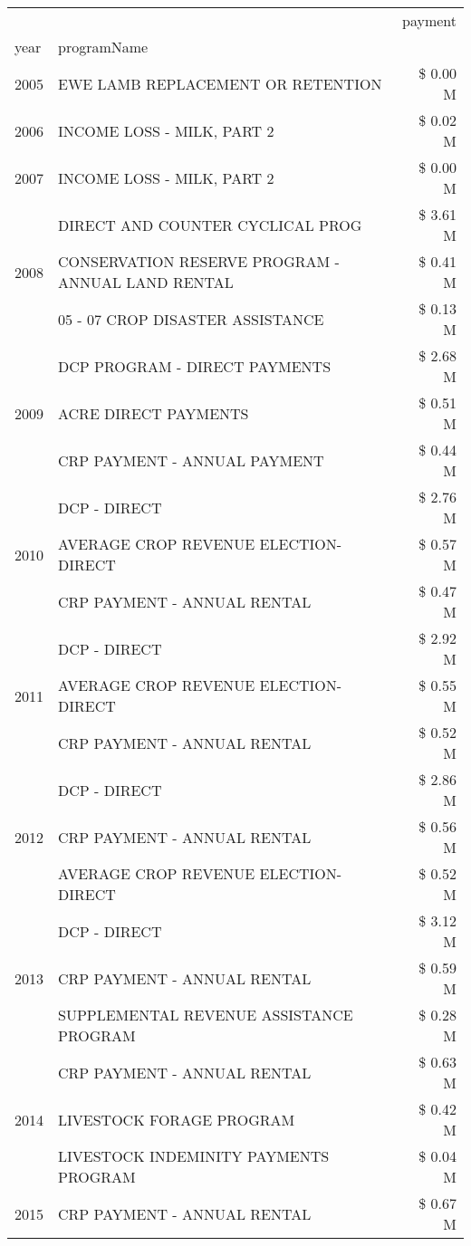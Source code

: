 \begin{tabular}{llr}
\toprule
 &  & payment \\
year & programName &  \\
\midrule
2005 & EWE LAMB REPLACEMENT OR RETENTION & \$ 0.00 M \\
\cline{1-3}
2006 & INCOME LOSS - MILK, PART 2 & \$ 0.02 M \\
\cline{1-3}
2007 & INCOME LOSS - MILK, PART 2 & \$ 0.00 M \\
\cline{1-3}
\multirow[t]{3}{*}{2008} & DIRECT AND COUNTER CYCLICAL PROG & \$ 3.61 M \\
 & CONSERVATION RESERVE PROGRAM - ANNUAL LAND RENTAL & \$ 0.41 M \\
 & 05 - 07 CROP DISASTER ASSISTANCE & \$ 0.13 M \\
\cline{1-3}
\multirow[t]{3}{*}{2009} & DCP PROGRAM - DIRECT PAYMENTS & \$ 2.68 M \\
 & ACRE DIRECT PAYMENTS & \$ 0.51 M \\
 & CRP PAYMENT - ANNUAL PAYMENT & \$ 0.44 M \\
\cline{1-3}
\multirow[t]{3}{*}{2010} & DCP - DIRECT & \$ 2.76 M \\
 & AVERAGE CROP REVENUE ELECTION-DIRECT & \$ 0.57 M \\
 & CRP PAYMENT - ANNUAL RENTAL & \$ 0.47 M \\
\cline{1-3}
\multirow[t]{3}{*}{2011} & DCP - DIRECT & \$ 2.92 M \\
 & AVERAGE CROP REVENUE ELECTION-DIRECT & \$ 0.55 M \\
 & CRP PAYMENT - ANNUAL RENTAL & \$ 0.52 M \\
\cline{1-3}
\multirow[t]{3}{*}{2012} & DCP - DIRECT & \$ 2.86 M \\
 & CRP PAYMENT - ANNUAL RENTAL & \$ 0.56 M \\
 & AVERAGE CROP REVENUE ELECTION-DIRECT & \$ 0.52 M \\
\cline{1-3}
\multirow[t]{3}{*}{2013} & DCP - DIRECT & \$ 3.12 M \\
 & CRP PAYMENT - ANNUAL RENTAL & \$ 0.59 M \\
 & SUPPLEMENTAL REVENUE ASSISTANCE PROGRAM & \$ 0.28 M \\
\cline{1-3}
\multirow[t]{3}{*}{2014} & CRP PAYMENT - ANNUAL RENTAL & \$ 0.63 M \\
 & LIVESTOCK FORAGE PROGRAM & \$ 0.42 M \\
 & LIVESTOCK INDEMINITY PAYMENTS PROGRAM & \$ 0.04 M \\
\cline{1-3}
\multirow[t]{3}{*}{2015} & CRP PAYMENT - ANNUAL RENTAL & \$ 0.67 M \\

\end{tabular}
